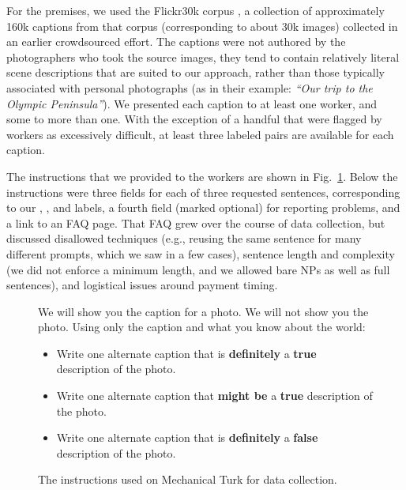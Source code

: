 For the premises, we used the Flickr30k corpus \cite{hodoshimage}, a collection of approximately 160k captions from that corpus (corresponding to about 30k images) collected in an earlier crowdsourced effort. The captions were not authored by the photographers who took the source images, they tend to contain relatively literal scene descriptions that are suited to our approach, rather than those typically associated with personal photographs (as in their example: \textit{``Our trip to the Olympic Peninsula''}). We presented each caption to at least one worker, and some to more than one. With the exception of a handful that were flagged by workers as excessively difficult, at least three labeled pairs are available for each caption.

The instructions that we provided to the workers are shown in Fig.~\ref{instructions-1}. Below the instructions were three fields for each of three requested sentences, corresponding to our , , and  labels, a fourth field (marked optional) for reporting problems, and a link to an FAQ page. That FAQ grew over the course of data collection, but discussed disallowed techniques (e.g., reusing the same sentence for many different prompts, which we saw in a few cases), sentence length and complexity (we did not enforce a minimum length, and we allowed bare NPs as well as full sentences), and logistical issues around payment timing.

\begin{figure}
\footnotesize
We will show you the caption for a photo. We will not show you the photo. Using only the caption and what you know about the world:
\begin{itemize}
\item Write one alternate caption that is \textbf{definitely} a \textbf{true} description of the photo. 
\item Write one alternate caption that \textbf{might be} a \textbf{true} description of the photo. 
\item Write one alternate caption that is \textbf{definitely} a \textbf{false} description of the photo. 
\end{itemize}
\caption{\label{instructions-1}The instructions used on Mechanical Turk for data collection.}
\end{figure}

